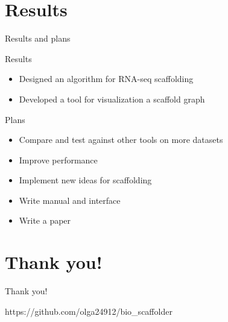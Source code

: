 \documentclass{beamer}
\begin{document}
\section{Results}
\begin{frame}[t]{Results and plans}
	\begin{block}{Results}
		\begin{itemize}
			\item Designed an algorithm for RNA-seq scaffolding 
			\item Developed a tool for visualization a scaffold graph
		\end{itemize}
	\end{block}
	\begin{block}{Plans}
		\begin{itemize}
			\item Compare and test against other tools on more datasets
			\item Improve performance
			\item Implement new ideas for scaffolding  
			\item Write manual and interface
			\item Write a paper
			\end{itemize}
	\end{block}
\end{frame}


\section{Thank you!}
\begin{frame}{Thank you!}
    \begin{center}
        https://github.com/olga24912/bio\_scaffolder
    \end{center}
\end{frame}
\end{document}
